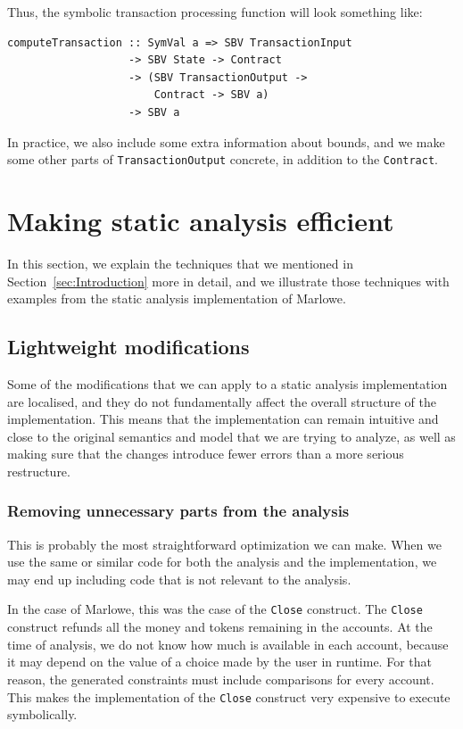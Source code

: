 \documentclass[english,runningheads]{llncs}
\begin{document}
Thus, the symbolic transaction processing function will look something
like:

\begin{verbatim}
computeTransaction :: SymVal a => SBV TransactionInput
                   -> SBV State -> Contract
                   -> (SBV TransactionOutput ->
                       Contract -> SBV a)
                   -> SBV a
\end{verbatim}

In practice, we also include some extra information about bounds,
and we make some other parts of \texttt{TransactionOutput} concrete,
in addition to the \texttt{Contract}.

\section{Making static analysis efficient\label{sec:Making-static-analysis-efficient}}

In this section, we explain the techniques that we mentioned in Section~\ref{sec:Introduction}
more in detail, and we illustrate those techniques with examples from
the static analysis implementation of Marlowe.

\subsection{Lightweight modifications\label{subsec:Lightweight-modifications}}

Some of the modifications that we can apply to a static analysis implementation
are localised, and they do not fundamentally affect the overall structure
of the implementation. This means that the implementation can remain
intuitive and close to the original semantics and model that we are
trying to analyze, as well as making sure that the changes introduce
fewer errors than a more serious restructure.

\subsubsection{Removing unnecessary parts from the analysis }

This is probably the most straightforward optimization we can make.
When we use the same or similar code for both the analysis and the
implementation, we may end up including code that is not relevant
to the analysis.

In the case of Marlowe, this was the case of the \texttt{Close} construct.
The \texttt{Close} construct refunds all the money and tokens remaining
in the accounts. At the time of analysis, we do not know how much
is available in each account, because it may depend on the value of
a choice made by the user in runtime. For that reason, the generated
constraints must include comparisons for every account. This makes
the implementation of the \texttt{Close} construct very expensive
to execute symbolically.
\end{document}
